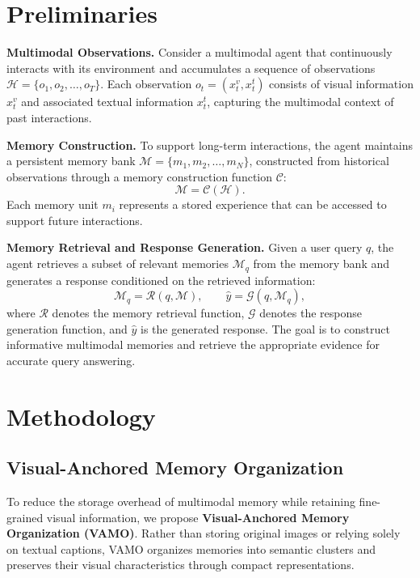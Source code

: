 \section{Preliminaries}
\label{sec:preliminaries}

\noindent\textbf{Multimodal Observations.}
Consider a multimodal agent that continuously interacts
with its environment and accumulates a sequence of
observations $\mathcal{H}=\{o_1,o_2,\ldots,o_T\}$.
Each observation $o_t=(x_t^{v},x_t^{t})$ consists of
visual information $x_t^{v}$ and associated textual
information $x_t^{t}$, capturing the multimodal context
of past interactions.

\noindent\textbf{Memory Construction.}
To support long-term interactions, the agent maintains
a persistent memory bank
$\mathcal{M}=\{m_1,m_2,\ldots,m_N\}$,
constructed from historical observations through
a memory construction function $\mathcal{C}$:
\begin{equation}
    \mathcal{M} = \mathcal{C}(\mathcal{H}).
\end{equation}
Each memory unit $m_i$ represents a stored experience
that can be accessed to support future interactions.

\noindent\textbf{Memory Retrieval and Response Generation.}
Given a user query $q$, the agent retrieves a subset
of relevant memories $\mathcal{M}_q$ from the memory bank
and generates a response conditioned on the retrieved
information:
\begin{equation}
    \mathcal{M}_q = \mathcal{R}(q,\mathcal{M}),
    \qquad
    \hat{y} = \mathcal{G}(q,\mathcal{M}_q),
\end{equation}
where $\mathcal{R}$ denotes the memory retrieval function,
$\mathcal{G}$ denotes the response generation function,
and $\hat{y}$ is the generated response.
The goal is to construct informative multimodal memories
and retrieve the appropriate evidence for accurate
query answering.


\section{Methodology}
\label{sec:method}


\subsection{Visual-Anchored Memory Organization}
\label{sec:vamo}

To reduce the storage overhead of multimodal memory while retaining fine-grained visual information, we propose \textbf{Visual-Anchored Memory Organization (VAMO)}. Rather than storing original images or relying solely on textual captions, VAMO organizes memories into semantic clusters and preserves their visual characteristics through compact representations.


